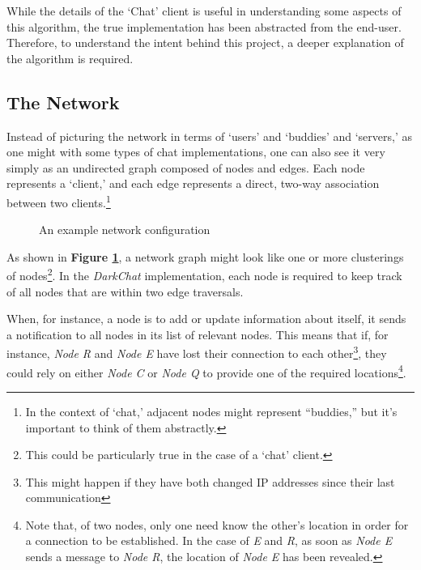 \documentclass[11pt]{article}
\begin{document}
While the details of the `Chat' client is useful in understanding some aspects of this algorithm, the true implementation has been abstracted from the end-user. Therefore, to understand the intent behind this project, a deeper explanation of the algorithm is required.

\subsection{The Network}

Instead of picturing the network in terms of `users' and `buddies' and `servers,' as one might with some types of chat implementations, one can also see it very simply as an undirected graph composed of nodes and edges. Each node represents a `client,' and each edge represents a direct, two-way association between two clients.\footnote{In the context of `chat,' adjacent nodes might represent ``buddies,'' but it's important to think of them abstractly.}

\begin{figure}
  \caption{An example network configuration}
  \begin{center}
  \end{center}
\label{graph}
\end{figure}

As shown in {\bf Figure \ref{graph}}, a network graph might look like one or more clusterings of nodes\footnote{This could be particularly true in the case of a `chat' client.}. In the \emph{DarkChat} implementation, each node is required to keep track of all nodes that are within two edge traversals.

When, for instance, a node is to add or update information about itself, it sends a notification to all nodes in its list of relevant nodes. This means that if, for instance, \emph{Node R} and \emph{Node E} have lost their connection to each other\footnote{This might happen if they have both changed IP addresses since their last communication}, they could rely on either \emph{Node C} or \emph{Node Q} to provide one of the required locations\footnote{Note that, of two nodes, only one need know the other's location in order for a connection to be established. In the case of \emph{E} and \emph{R}, as soon as \emph{Node E} sends a message to \emph{Node R}, the location of \emph{Node E} has been revealed.}.
\end{document}
